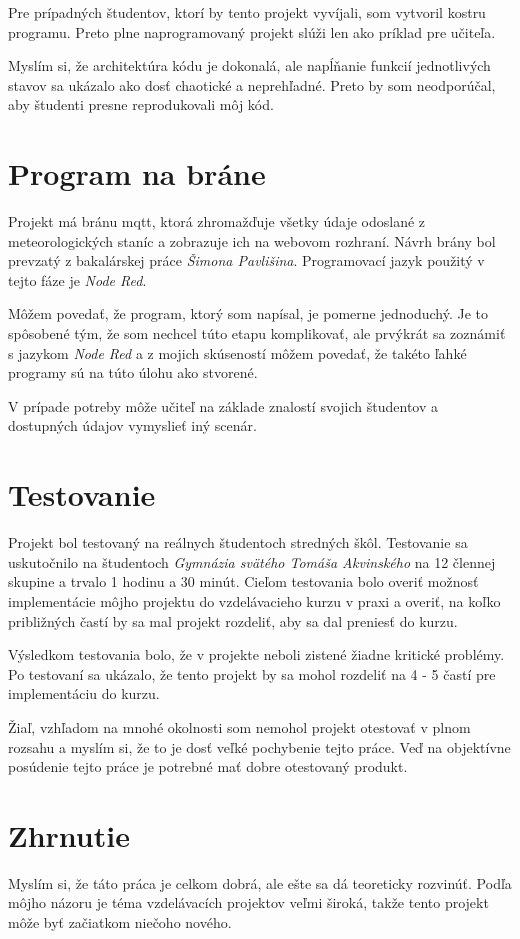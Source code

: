 Pre prípadných študentov, ktorí by tento projekt vyvíjali, som vytvoril kostru programu. Preto plne naprogramovaný projekt slúži len ako príklad pre učiteľa.

Myslím si, že architektúra kódu je dokonalá, ale napĺňanie funkcií jednotlivých stavov sa ukázalo ako dosť chaotické a neprehľadné. Preto by som neodporúčal, aby študenti presne reprodukovali môj kód.

\section{Program na bráne}

Projekt má bránu \gls{mqtt}, ktorá zhromažďuje všetky údaje odoslané z meteorologických staníc a zobrazuje ich na webovom rozhraní. Návrh brány bol prevzatý z bakalárskej práce \textit{Šimona Pavlišina}\cite{bookSimon}. Programovací jazyk použitý v tejto fáze je \textit{Node Red}.

Môžem povedať, že program, ktorý som napísal, je pomerne jednoduchý. Je to spôsobené tým, že som nechcel túto etapu komplikovať, ale prvýkrát sa zoznámiť s jazykom \textit{Node Red} a z mojich skúseností môžem povedať, že takéto ľahké programy sú na túto úlohu ako stvorené.

V prípade potreby môže učiteľ na základe znalostí svojich študentov a dostupných údajov vymyslieť iný scenár.

\section{Testovanie}

Projekt bol testovaný na reálnych študentoch stredných škôl. Testovanie sa uskutočnilo na študentoch \textit{Gymnázia svätého Tomáša Akvinského} na 12 člennej skupine a trvalo 1 hodinu a 30 minút. Cieľom testovania bolo overiť možnosť implementácie môjho projektu do vzdelávacieho kurzu v praxi a overiť, na koľko približných častí by sa mal projekt rozdeliť, aby sa dal preniesť do kurzu.

Výsledkom testovania bolo, že v projekte neboli zistené žiadne kritické problémy. Po testovaní sa ukázalo, že tento projekt by sa mohol rozdeliť na 4 - 5 častí pre implementáciu do kurzu.

Žiaľ, vzhľadom na mnohé okolnosti som nemohol projekt otestovať v plnom rozsahu a myslím si, že to je dosť veľké pochybenie tejto práce. Veď na objektívne posúdenie tejto práce je potrebné mať dobre otestovaný produkt.

\section{Zhrnutie}

Myslím si, že táto práca je celkom dobrá, ale ešte sa dá teoreticky rozvinúť. Podľa môjho názoru je téma vzdelávacích projektov veľmi široká, takže tento projekt môže byť začiatkom niečoho nového.

